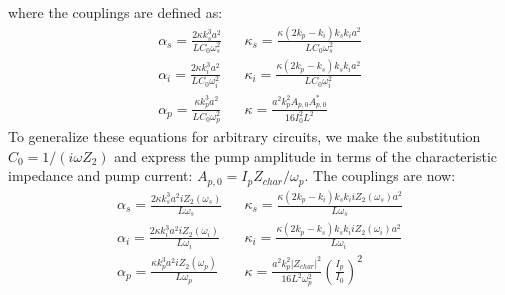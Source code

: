 where the couplings are defined as:
\begin{align}
\alpha_s = \frac{2\kappa k_s^3 a^2}{LC_0\omega _s^2} && \kappa _s = \frac{\kappa (2 k_p - k_i)k_s k_i a^2}{LC_0\omega _s^2} \label{eq:a11}\\
\alpha_i = \frac{2\kappa k_i^3a^2}{LC_0\omega _i^2} && \kappa _i = \frac{\kappa (2k_p - k_s)k_s k_i a^2}{LC_0\omega _i^2} \label{eq:a12}\\
\alpha_p = \frac{\kappa k_p^3 a^2}{LC_0\omega _p^2} && \kappa  = \frac{a^2 k_p^2 A_{p,0}A_{p,0}^*}{16I_0^2 L^2} \label{eq:a13}
\end{align}
To generalize these equations for arbitrary circuits, we make the substitution ${C_0} = 1/(i\omega Z_2)$ and express the pump amplitude in terms of the characteristic impedance and pump current: $A_{p,0}=I_p Z_{char}/\omega_p$. The couplings are now:
\begin{align}
\alpha_s = \frac{2\kappa k_s^3 a^2 i Z_2(\omega_s)} {L\omega _s} && \kappa _s = \frac{\kappa (2 k_p - k_i)k_s k_i i Z_2(\omega_s) a^2}{L\omega _s} \label{eq:a14}\\
\alpha_i = \frac{2\kappa k_i^3a^2 i Z_2(\omega_i)} {L\omega _i} && \kappa _i = \frac{\kappa (2k_p - k_s)k_s k_i i Z_2(\omega_i) a^2}{L\omega _i} \label{eq:a15}\\
\alpha_p = \frac{\kappa k_p^3 a^2 i Z_2(\omega_p)} {L\omega _p} && \kappa  = \frac{a^2 k_p^2 |Z_{char}|^2}{16L^2 \omega_p^2} \left(\frac{I_p}{I_0}\right)^2 \label{eq:a16}
\end{align}

